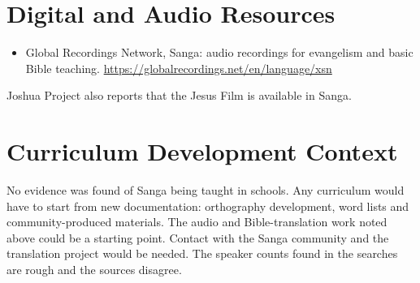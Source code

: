 \documentclass[12pt]{article}
\begin{document}
\section{Digital and Audio Resources}
\begin{itemize}
\item Global Recordings Network, Sanga: audio recordings for evangelism and basic Bible teaching. \url{https://globalrecordings.net/en/language/xsn}
\end{itemize}
Joshua Project also reports that the Jesus Film is available in Sanga.

\section{Curriculum Development Context}
No evidence was found of Sanga being taught in schools. Any curriculum would have to start from new documentation: orthography development, word lists and community-produced materials. The audio and Bible-translation work noted above could be a starting point. Contact with the Sanga community and the translation project would be needed. The speaker counts found in the searches are rough and the sources disagree.
\end{document}
